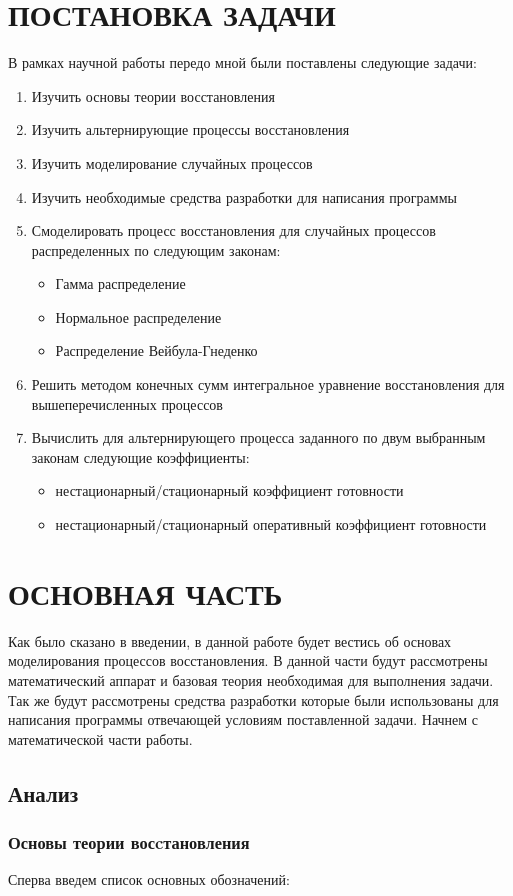 \chapter*{ПОСТАНОВКА ЗАДАЧИ}
В рамках научной работы передо мной были поставлены следующие задачи:\\
\begin{enumerate}
\item Изучить основы теории восстановления
\item Изучить альтернирующие  процессы восстановления
\item Изучить моделирование случайных процессов
\item Изучить необходимые средства разработки для написания программы
\item Смоделировать процесс восстановления для случайных процессов распределенных по следующим законам:
\begin{itemize}
\item Гамма распределение
\item Нормальное распределение
\item Распределение Вейбула-Гнеденко
\end{itemize}
\item Решить методом конечных сумм интегральное уравнение восстановления для вышеперечисленных процессов
\item Вычислить для альтернирующего процесса заданного по двум выбранным законам следующие коэффициенты:
\begin{itemize}
\item нестационарный/стационарный коэффициент готовности
\item нестационарный/стационарный оперативный коэффициент готовности
\end{itemize}
\end{enumerate}
\newpage
\chapter*{ОСНОВНАЯ ЧАСТЬ}
Как было сказано в введении, в данной работе будет вестись об основах моделирования процессов восстановления. 
В данной части будут рассмотрены математический аппарат и базовая теория необходимая для выполнения задачи. Так же будут рассмотрены средства разработки которые были использованы для написания программы отвечающей условиям поставленной задачи. Начнем с математической части работы.
\begin{center}
\section{Анализ}
\subsection{Основы теории восcтановления}
\end{center}
Сперва введем список основных обозначений:

